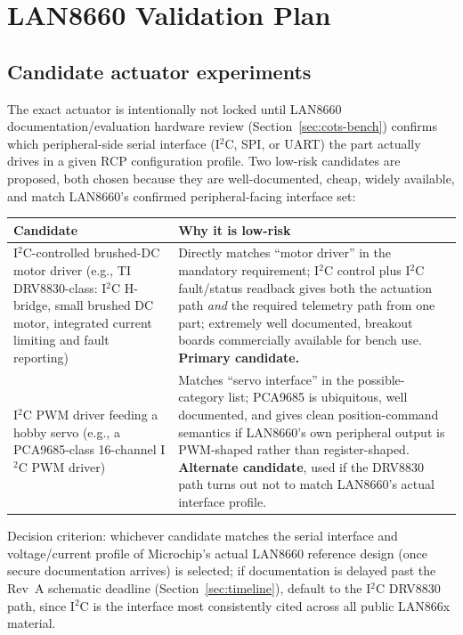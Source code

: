 \section{LAN8660 Validation Plan}
\label{sec:lan8660-validation}

\subsection{Candidate actuator experiments}

The exact actuator is intentionally not locked until LAN8660 documentation/evaluation hardware review (Section~\ref{sec:cots-bench}) confirms which peripheral-side serial interface (I$^2$C, SPI, or UART) the part actually drives in a given RCP configuration profile. Two low-risk candidates are proposed, both chosen because they are well-documented, cheap, widely available, and match LAN8660's confirmed peripheral-facing interface set:

\begin{center}
\small
\begin{tabularx}{\linewidth}{@{}p{3.2cm} X@{}}
\toprule
\textbf{Candidate} & \textbf{Why it is low-risk} \\
\midrule
I$^2$C-controlled brushed-DC motor driver (e.g., TI DRV8830-class: I$^2$C H-bridge, small brushed DC motor, integrated current limiting and fault reporting) & Directly matches ``motor driver'' in the mandatory requirement; I$^2$C control plus I$^2$C fault/status readback gives both the actuation path \emph{and} the required telemetry path from one part; extremely well documented, breakout boards commercially available for bench use. \textbf{Primary candidate.} \\
I$^2$C PWM driver feeding a hobby servo (e.g., a PCA9685-class 16-channel I$^2$C PWM driver) & Matches ``servo interface'' in the possible-category list; PCA9685 is ubiquitous, well documented, and gives clean position-command semantics if LAN8660's own peripheral output is PWM-shaped rather than register-shaped. \textbf{Alternate candidate}, used if the DRV8830 path turns out not to match LAN8660's actual interface profile. \\
\bottomrule
\end{tabularx}
\end{center}

Decision criterion: whichever candidate matches the serial interface and voltage/current profile of Microchip's actual LAN8660 reference design (once secure documentation arrives) is selected; if documentation is delayed past the Rev~A schematic deadline (Section~\ref{sec:timeline}), default to the I$^2$C DRV8830 path, since I$^2$C is the interface most consistently cited across all public LAN866x material.

